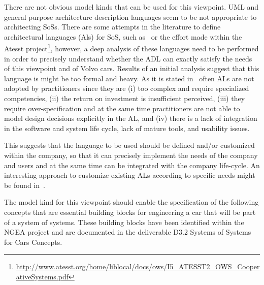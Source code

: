 There are not obvious model kinds that can be used for this viewpoint. UML and general purpose architecture description languages seem to be not appropriate to architecting SoSs. There are some attempts in the literature to define architectural languages (Als) for SoS, such as~\cite{SoSADL} or the effort made within the Atesst project\footnote{\url{http://www.atesst.org/home/liblocal/docs/ows/I5_ATESST2_OWS_CooperativeSystems.pdf}}, however, a deep analysis of these languages need to be performed in order to precisely understand whether the ADL can exactly satisfy the needs of this viewpoint and of Volvo cars. Results of an initial analysis suggest that this language is might be too formal and heavy. As it is stated in~\cite{whatindustrywants,IEEESoftwarePatrizio} often ALs are not adopted by practitioners since they are (i) too complex and require specialized competencies, (ii) the return on investment is insufficient perceived, (iii) they require over-specification and at the same time practitioners are not able to model design decisions explicitly in the AL, and (iv) there is a lack of integration in the software and system life cycle, lack of
mature tools, and usability issues. 

This suggests that the language to be used should be defined and/or customized within the company, so that it can precisely implement the needs of the company and users and at the same time can be integrated with the company life-cycle.
An interesting approach to customize existing ALs according to specific needs might be found in~\cite{ICSE2010}.

The model kind for this viewpoint should enable the specification of the following concepts that are essential building blocks for engineering a car that will be part of a system of systems. These building blocks have been identified within the NGEA project and are documented in the deliverable D3.2 Systems of Systems for Cars Concepts. 


